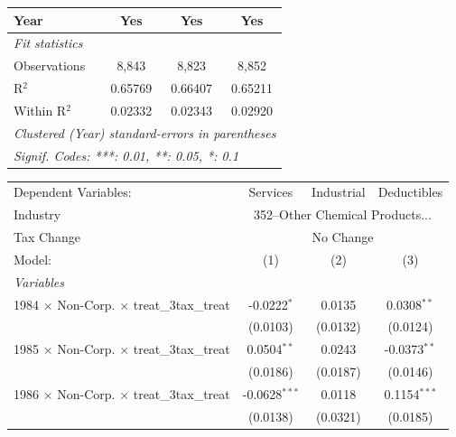 \documentclass[
  12pt]{article}
\theoremstyle{definition}
\theoremstyle{remark}
\begin{document}
\begin{table}
\begin{minipage}{\linewidth}
\begin{tabular}{lccc}
   Year                                                    & Yes            & Yes             & Yes\\  
   \midrule
   \emph{Fit statistics}\\
   Observations                                            & 8,843          & 8,823           & 8,852\\  
   R$^2$                                                   & 0.65769        & 0.66407         & 0.65211\\  
   Within R$^2$                                            & 0.02332        & 0.02343         & 0.02920\\  
   \midrule \midrule
   \multicolumn{4}{l}{\emph{Clustered (Year) standard-errors in parentheses}}\\
   \multicolumn{4}{l}{\emph{Signif. Codes: ***: 0.01, **: 0.05, *: 0.1}}\\
\end{tabular}
\par\endgroup
\begingroup
\centering
\begin{tabular}{lccc}
   \tabularnewline \midrule \midrule
   Dependent Variables:                                    & Services        & Industrial & Deductibles\\  
   Industry & \multicolumn{3}{c}{352–Other Chemical Products...} \\ 
   Tax Change & \multicolumn{3}{c}{No Change} \\ 
   Model:                                                  & (1)             & (2)        & (3)\\  
   \midrule
   \emph{Variables}\\
   1984 $\times$ Non-Corp. $\times$ treat\_3tax\_treat     & -0.0222$^{*}$   & 0.0135     & 0.0308$^{**}$\\   
                                                           & (0.0103)        & (0.0132)   & (0.0124)\\   
   1985 $\times$ Non-Corp. $\times$ treat\_3tax\_treat     & 0.0504$^{**}$   & 0.0243     & -0.0373$^{**}$\\   
                                                           & (0.0186)        & (0.0187)   & (0.0146)\\   
   1986 $\times$ Non-Corp. $\times$ treat\_3tax\_treat     & -0.0628$^{***}$ & 0.0118     & 0.1154$^{***}$\\   
                                                           & (0.0138)        & (0.0321)   & (0.0185)\\   

\end{tabular}
\end{minipage}
\end{table}
\end{document}
